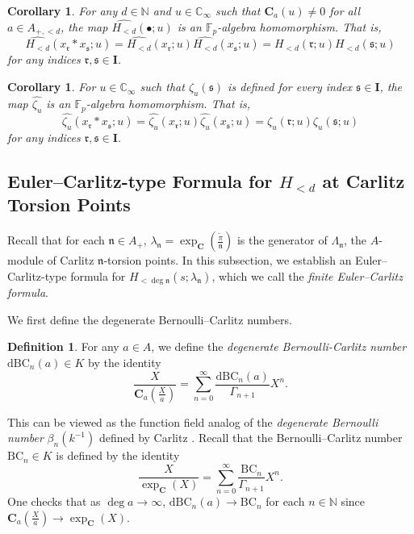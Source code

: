 \documentclass[12pt,reqno]{amsart}
\numberwithin{equation}{section}
\theoremstyle{plain}
\newtheorem{cor}[thm]{Corollary}
\theoremstyle{definition}
\newtheorem{df}[thm]{Definition}
\theoremstyle{remark}
\newcommand{\NN}{\mathbb{N}}
\newcommand{\CC}{\mathbb{C}}
\newcommand{\FF}{\mathbb{F}}
\newcommand{\nfk}{\mathfrak{n}}
\newcommand{\cpi}{\tilde{\pi}}
\newcommand{\ww}[1]{\mathfrak{#1}}
\newcommand{\C}{\mathbf{C}}
\newcommand{\BC}{\mathrm{BC}}
\newcommand{\dBC}{\mathrm{dBC}}
\newcommand{\Ical}{\mathbf{I}}
\begin{document}
\begin{cor}\label{cor:Hu shuffle}
    For any $d\in\NN$ and $u\in \CC_\infty$ such that $\C_a(u)\neq 0$ for all $a\in A_{+,<d}$, the map $\widehat{H_{<d}}(\bullet;u)$ is an $\FF_p$-algebra homomorphism. That is,
    $$\widehat{H_{<d}}(x_{\ww{r}}\ast x_{\ww{s}};u) =\widehat{H_{<d}}(x_{\ww{r}};u)\widehat{H_{<d}}(x_{\ww{s}};u)=H_{<d}(\ww{r};u)H_{<d}(\ww{s};u)$$
    for any indices $\ww{r},\ww{s}\in\Ical$.
\end{cor}

\begin{cor}\label{cor:zeta u shuffle}
    For $u\in\CC_\infty$ such that $\zeta_u(\ww{s})$ is defined for every index $\ww{s} \in \Ical$, the map $\widehat{\zeta_u}$ is an $\FF_p$-algebra homomorphism. That is,
    $$\widehat{\zeta_u}(x_{\ww{r}}\ast x_{\ww{s}};u) =\widehat{\zeta_u}(x_{\ww{r}};u)\widehat{\zeta_u}(x_{\ww{s}};u)=\zeta_u(\ww{r};u)\zeta_u(\ww{s};u)$$
    for any indices $\ww{r},\ww{s}\in\Ical$.
\end{cor}
\subsection{Euler--Carlitz-type Formula for \texorpdfstring{$H_{<d}$}{H<d} at Carlitz Torsion Points}\label{section:3.3}
Recall that for each $\nfk\in A_+$,  $\lambda_{\nfk}=\exp_{\C}(\frac{\cpi}{\nfk})$ is the generator of $\Lambda_\nfk$, the $A$-module of Carlitz $\nfk$-torsion points. In this subsection, we establish an Euler--Carlitz-type formula for $H_{<{\deg\nfk}}(s;\lambda_\nfk)$, which we call the \textit{finite Euler--Carlitz formula}. 

We first define the degenerate Bernoulli--Carlitz numbers.
\begin{df}
    For any $a\in A$, we define the \textit{degenerate Bernoulli-Carlitz number} $\dBC_n(a)\in K$ by the identity
    $$\frac{X}{\C_a\left(\frac{X}{a}\right)}=\sum_{n=0}^\infty \frac{\dBC_n(a)}{\Gamma_{n+1}}X^n.$$
\end{df}
This can be viewed as the function field analog of the \textit{degenerate Bernoulli number} $\beta_n(k^{-1})$ defined by Carlitz \cite{Carlitz1956}.
Recall that the Bernoulli--Carlitz number $\BC_n\in K$ is defined by the identity
$$\frac{X}{\exp_{\C}(X)}=\sum_{n=0}^\infty \frac{\BC_n}{\Gamma_{n+1}}X^n.$$
One checks that as $\deg a\to\infty$, $\dBC_n(a)\to \BC_n$ for each $n\in\NN$ since $\C_a(\frac{X}{a})\to \exp_{\C}(X)$.
\end{document}
